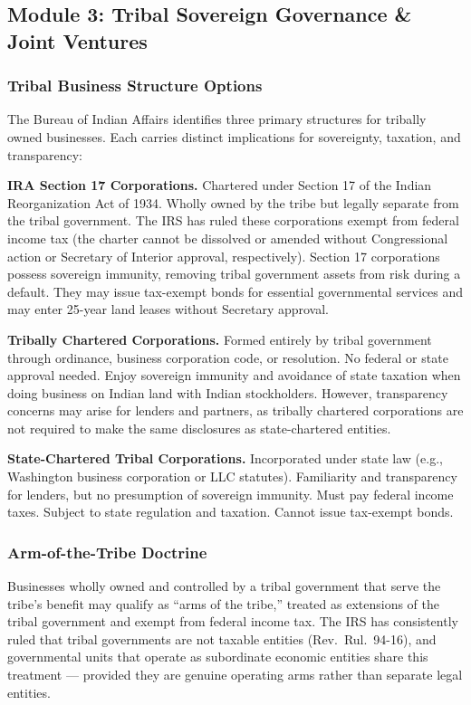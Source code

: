 \documentclass[11pt,letterpaper]{article}
\begin{document}
\subsection{Module 3: Tribal Sovereign Governance \& Joint Ventures}

\subsubsection{Tribal Business Structure Options}

The Bureau of Indian Affairs identifies three primary structures for tribally owned businesses. Each carries distinct implications for sovereignty, taxation, and transparency:

\textbf{IRA Section 17 Corporations.} Chartered under Section 17 of the Indian Reorganization Act of 1934. Wholly owned by the tribe but legally separate from the tribal government. The IRS has ruled these corporations exempt from federal income tax (the charter cannot be dissolved or amended without Congressional action or Secretary of Interior approval, respectively). Section 17 corporations possess sovereign immunity, removing tribal government assets from risk during a default. They may issue tax-exempt bonds for essential governmental services and may enter 25-year land leases without Secretary approval.

\textbf{Tribally Chartered Corporations.} Formed entirely by tribal government through ordinance, business corporation code, or resolution. No federal or state approval needed. Enjoy sovereign immunity and avoidance of state taxation when doing business on Indian land with Indian stockholders. However, transparency concerns may arise for lenders and partners, as tribally chartered corporations are not required to make the same disclosures as state-chartered entities.

\textbf{State-Chartered Tribal Corporations.} Incorporated under state law (e.g., Washington business corporation or LLC statutes). Familiarity and transparency for lenders, but no presumption of sovereign immunity. Must pay federal income taxes. Subject to state regulation and taxation. Cannot issue tax-exempt bonds.

\subsubsection{Arm-of-the-Tribe Doctrine}

Businesses wholly owned and controlled by a tribal government that serve the tribe's benefit may qualify as ``arms of the tribe,'' treated as extensions of the tribal government and exempt from federal income tax. The IRS has consistently ruled that tribal governments are not taxable entities (Rev.\ Rul.\ 94-16), and governmental units that operate as subordinate economic entities share this treatment --- provided they are genuine operating arms rather than separate legal entities.
\end{document}
